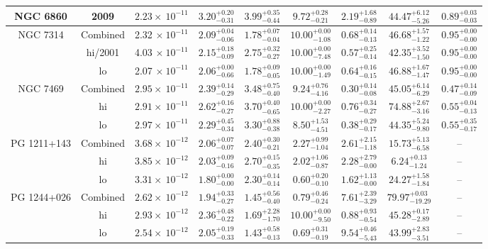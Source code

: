 \documentclass{article}
\begin{document}
\begin{landscape}
\begin{longtable}{ccccccccc}
NGC 6860 & 2009 & $2.23 \times~10^{-11}$ & $3.20^{+0.20}_{-0.31}$ & $3.99^{+0.35}_{-0.44}$ & $9.72^{+0.28}_{-0.21}$ & $2.19^{+1.68}_{-0.89}$ & $44.47^{+6.12}_{-5.26}$ & $0.89^{+0.03}_{-0.03}$ \\  \hline 

NGC 7314 & Combined & 2.32 $\times~10^{-11}$ & $2.09^{+0.04}_{-0.06}$ & $1.78^{+0.07}_{-0.04}$ & $10.00^{+0.00}_{-1.08}$ & $0.68^{+0.14}_{-0.13}$ & $46.68^{+1.57}_{-1.22}$  & $0.95^{+0.00}_{-0.00}$\\
& hi/2001 & 4.03 $\times~10^{-11}$ & $2.15^{+0.18}_{-0.09}$ & $2.75^{+0.32}_{-0.27}$ & $10.00^{+0.00}_{-7.48}$ & $0.57^{+0.25}_{-0.14}$ & $42.35^{+3.52}_{-1.50}$  & $0.95^{+0.00}_{-0.00}$\\
& lo & 2.07 $\times~10^{-11}$ & $2.06^{+0.00}_{-0.66}$ & $1.78^{+0.09}_{-0.05}$ & $10.00^{+0.00}_{-1.49}$ & $0.64^{+0.16}_{-0.15}$ & $46.88^{+1.67}_{-1.47}$  & $0.95^{+0.00}_{-0.00}$\\ \hline

NGC 7469 & Combined &  $2.95 \times~10^{-11}$ & $2.39^{+0.14}_{-0.29}$ & $3.48^{+0.75}_{-0.40}$ & $9.24^{+0.76}_{-4.16}$ & $0.30^{+0.14}_{-0.08}$ & $45.05^{+6.14}_{-6.29}$ &  $0.47^{+0.14}_{-0.09}$ \\
& hi & $2.91 \times~10^{-11}$ & $2.62^{+0.16}_{-0.27}$ & $3.70^{+0.40}_{-0.65}$ & $10.00^{+0.00}_{-2.27}$ & $0.76^{+0.34}_{-0.27}$ & $74.88^{+2.67}_{-3.16}$ &  $0.55^{+0.04}_{-0.13}$ \\
& lo & $2.97 \times~10^{-11}$ & $2.29^{+0.45}_{-0.34}$ & $3.30^{+0.88}_{-0.38}$ & $8.50^{+1.53}_{-4.51}$ & $0.38^{+0.29}_{-0.17}$ & $44.35^{+5.24}_{-9.80}$ &  $0.55^{+0.35}_{-0.17}$ \\ \hline

PG 1211+143 & Combined &  $3.68 \times~10^{-12}$ & $2.06^{+0.07}_{-0.07}$ &  $2.40^{+0.30}_{-0.21}$ & $2.27^{+0.99}_{-1.04}$ & $2.61^{+2.15}_{-1.18}$ & $15.73^{+5.13}_{-6.58}$ & --  \\ 
& hi &  $3.85 \times~10^{-12}$ & $2.03^{+0.09}_{-0.16}$ &  $2.70^{+0.15}_{-0.35}$ & $2.02^{+1.06}_{-0.87}$ & $2.28^{+2.79}_{-0.00}$ & $6.24^{+0.13}_{-1.24}$ & --  \\ 
& lo &  $3.31 \times~10^{-12}$ & $1.80^{+0.00}_{-0.00}$ & $2.30^{+0.14}_{-0.14}$ & $0.60^{+0.20}_{-0.10}$ & $1.62^{+1.13}_{-0.00}$ & $24.27^{+1.58}_{-1.84}$ & -- \\ \hline 

PG 1244+026 & Combined & $2.62 \times~10^{-12}$ & $1.94^{+0.33}_{-0.27}$ & $1.45^{+0.56}_{-0.40}$ & $0.79^{+0.46}_{-0.24}$ & $7.61^{+2.39}_{-3.29}$ & $79.97^{+0.03}_{-19.29}$ & -- \\
& hi & $2.93 \times~10^{-12}$ & $2.36^{+0.48}_{-0.22}$ & $1.69^{+2.28}_{-1.70}$ & $10.00^{+0.00}_{-9.50}$ & $0.88^{+0.93}_{-0.54}$ & $45.28^{+0.17}_{-2.89}$ & -- \\
& lo & $2.54 \times~10^{-12}$ & $2.05^{+0.19}_{-0.33}$ & $1.43^{+0.58}_{-0.13}$ & $0.69^{+0.31}_{-0.19}$ & $9.54^{+0.46}_{-5.43}$ & $43.99^{+2.83}_{-3.51}$ & -- \\ \hline 


\end{longtable}
\end{landscape}
\end{document}
